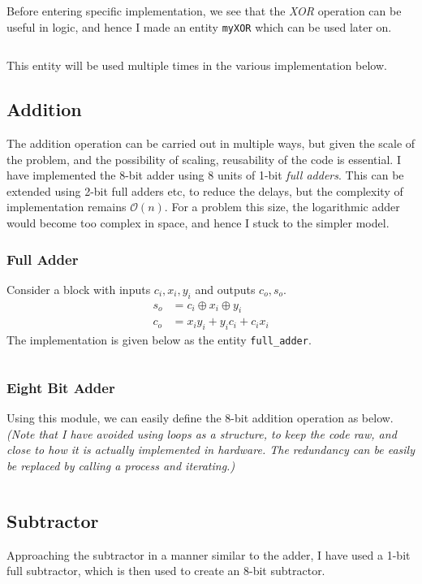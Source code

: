 \documentclass[a4paper, 11pt]{article}
\begin{document}
Before entering specific implementation, we see that the \emph{XOR} operation can be useful in logic, and hence I made an entity \texttt{myXOR} which can be used later on.
\inputminted{vhdl}{ALU_exp/xor.vhd}

This entity will be used multiple times in the various implementation below.
\subsection{Addition}

The addition operation can be carried out in multiple ways, but given the scale of the problem, and the possibility of scaling, reusability of the code is essential. I have implemented the 8-bit adder using 8 units of 1-bit \emph{full adders}. This can be extended using 2-bit full adders etc, to reduce the delays, but the complexity of implementation remains $\mathcal{O}(n)$. For a problem this size, the logarithmic adder would become too complex in space, and hence I stuck to the simpler model.

\subsubsection*{Full Adder}
Consider a block with inputs $c_i, x_i, y_i$ and outputs $c_o, s_o$.
\begin{equation}
\begin{split}
s_o &= c_i \oplus x_i \oplus y_i \\
c_o &= x_iy_i + y_ic_i + c_ix_i
\end{split}
\end{equation}
The implementation is given below as the entity \texttt{full\_adder}.

\inputminted[linenos]{vhdl}{ALU_exp/full_adder.vhd}


\subsubsection*{Eight Bit Adder}
Using this module, we can easily define the 8-bit addition operation as below. {\em (Note that I have avoided using loops as a structure, to keep the code raw, and close to how it is actually implemented in hardware. The redundancy can be easily be replaced by calling a process and iterating.)}

\inputminted[linenos]{vhdl}{ALU_exp/EightBitAdder.vhd}
\newpage
\subsection{Subtractor}
Approaching the subtractor in a manner similar to the adder, I have used a 1-bit full subtractor, which is then used to create an 8-bit subtractor.
\end{document}
